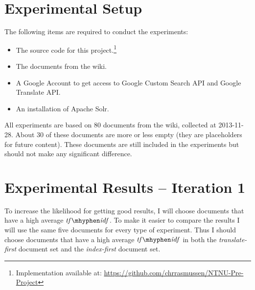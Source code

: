 \documentclass[a4paper]{book}
\newcommand\tfidf{\mathit{tf\mhyphen idf}}
\begin{document}
\section{Experimental Setup}
\label{sec:experimentalSetup}

The following items are required to conduct the experiments:
\begin{itemize}
\item The source code for this project.\footnote{Implementation available at: \url{https://github.com/chrrasmussen/NTNU-Pre-Project}}
\item The documents from the wiki.
\item A Google Account to get access to Google Custom Search API and Google Translate API.
\item An installation of Apache Solr.
\end{itemize}

All experiments are based on 80 documents from the wiki, collected at 2013-11-28. About 30 of these documents are more or less empty (they are placeholders for future content). These documents are still included in the experiments but should not make any significant difference.

\section{Experimental Results -- Iteration 1}
\label{sec:experimentalResults}

To increase the likelihood for getting good results, I will choose documents that have a high average $\tfidf$. To make it easier to compare the results I will use the same five documents for every type of experiment. Thus I should choose documents that have a high average $\tfidf$ in both the \textit{translate-first} document set and the \textit{index-first} document set.
\end{document}
